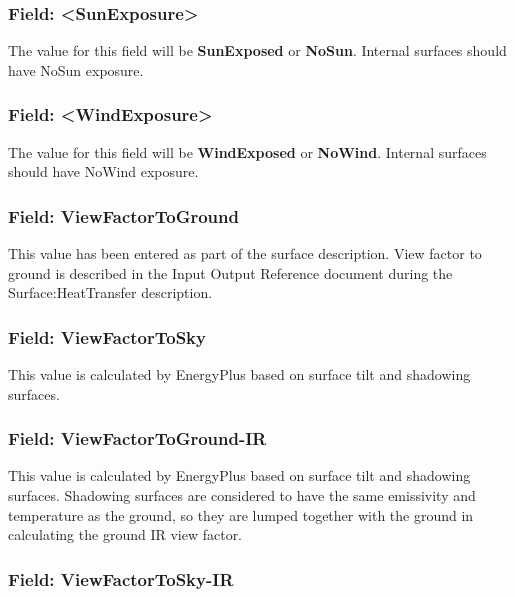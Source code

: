 \subsubsection{Field: \textless{}SunExposure\textgreater{}}\label{field-sunexposure}

The value for this field will be \textbf{SunExposed} or \textbf{NoSun}. Internal surfaces should have NoSun exposure.

\subsubsection{Field: \textless{}WindExposure\textgreater{}}\label{field-windexposure}

The value for this field will be \textbf{WindExposed} or \textbf{NoWind}. Internal surfaces should have NoWind exposure.

\subsubsection{Field: ViewFactorToGround}\label{field-viewfactortoground}

This value has been entered as part of the surface description. View factor to ground is described in the Input Output Reference document during the Surface:HeatTransfer description.

\subsubsection{Field: ViewFactorToSky}\label{field-viewfactortosky}

This value is calculated by EnergyPlus based on surface tilt and shadowing surfaces.

\subsubsection{Field: ViewFactorToGround-IR}\label{field-viewfactortoground-ir}

This value is calculated by EnergyPlus based on surface tilt and shadowing surfaces. Shadowing surfaces are considered to have the same emissivity and temperature as the ground, so they are lumped together with the ground in calculating the ground IR view factor.

\subsubsection{Field: ViewFactorToSky-IR}\label{field-viewfactortosky-ir}


